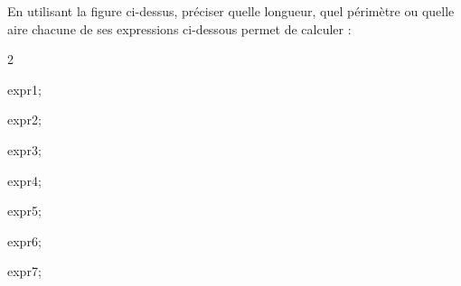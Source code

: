\documentclass[exercice]{thedocument}%
\begin{document}
%
En utilisant la figure ci-dessus, préciser quelle longueur, quel périmètre
ou quelle aire chacune de ses expressions ci-dessous permet de calculer :
\begin{enumerate}
    \begin{multicols}{2}
        \item \<expr1;
        \item \<expr2;
        \item \<expr3;
        \columnbreak
        \item \<expr4;
        \item \<expr5;
        \item \<expr6;
        \item \<expr7;
    \end{multicols}
\end{enumerate}
\end{document}
